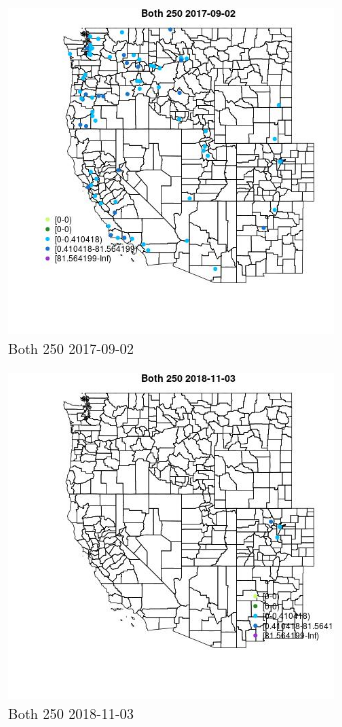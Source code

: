 \begin{figure} 
\centering  
\includegraphics[width=0.77\textwidth]{Code_Outputs/Report_ML_input_PM25_Step4_part_e_de_duplicated_aveswNAs_MapObsBoth_2502017-09-02.jpg} 
\caption{\label{fig:Report_ML_input_PM25_Step4_part_e_de_duplicated_aveswNAsMapObsBoth_2502017-09-02}Both 250 2017-09-02} 
\end{figure} 
 

\clearpage 

\begin{figure} 
\centering  
\includegraphics[width=0.77\textwidth]{Code_Outputs/Report_ML_input_PM25_Step4_part_e_de_duplicated_aveswNAs_MapObsBoth_2502018-11-03.jpg} 
\caption{\label{fig:Report_ML_input_PM25_Step4_part_e_de_duplicated_aveswNAsMapObsBoth_2502018-11-03}Both 250 2018-11-03} 
\end{figure} 
 

